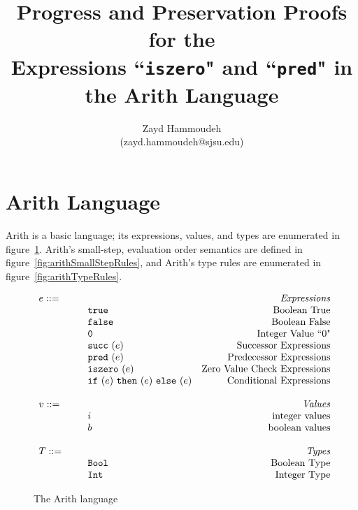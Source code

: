 \documentclass{report}
\title{Progress and Preservation Proofs for the \\
Expressions ``\texttt{iszero}" and ``\texttt{pred}" in the Arith Language}
\author{
  Zayd Hammoudeh \\
  (zayd.hammoudeh@sjsu.edu)
  }
\begin{document}
\maketitle


\tableofcontents{\protect\newpage}

\listoffigures
\newpage
 

\renewcommand\thesection{\arabic{section}}

\section{Arith Language}\label{sec:jvm}

Arith is a basic language; its expressions, values, and types are enumerated in figure~\ref{fig:arithLanguage}.  Arith's small-step, evaluation order semantics are defined in figure~\ref{fig:arithSmallStepRules}, and Arith's type rules are enumerated in figure~\ref{fig:arithTypeRules}.

\newcommand{\mydefhead}[2]{\multicolumn{2}{l}{{#1}}&\mbox{\emph{#2}}\\}
\newcommand{\mydefcase}[2]{\qquad\qquad& #1 &\mbox{#2}\\}

\newcommand{\assign}[2]{#1~{:=}~#2}
\newcommand{\ife}[3]{\mbox{\tt if}~({#1})~\mbox{\tt then}~({#2})~\mbox{\tt else}~({#3})}
\newcommand{\iszeroe}[1]{\mbox{\tt iszero}~(#1)}
\newcommand{\prede}[1]{\mbox{\tt pred}~(#1)}
\newcommand{\succe}[1]{\mbox{\tt succ}~(#1)}
\newcommand{\true}{\mbox{\tt true}}
\newcommand{\false}{\mbox{\tt false}}
\newcommand{\zero}{\mbox{\tt 0}}
\newcommand{\boolt}{\mbox{\tt Bool}}
\newcommand{\intt}{\mbox{\tt Int}}

\begin{figure}[ht!]
\[
\begin{array}{llr}
  \mydefhead{e ::=\qquad\qquad\qquad\qquad}{Expressions}
  \mydefcase{\true}{Boolean True}
  \mydefcase{\false}{Boolean False}
  \mydefcase{\zero}{Integer Value ``0"}
  \mydefcase{\succe e}{Successor Expressions}
  \mydefcase{\prede e}{Predecessor Expressions}
  \mydefcase{\iszeroe e}{Zero Value Check Expressions}
  \mydefcase{\ife e e e}{Conditional Expressions}
  \\
  \mydefhead{v ::=\qquad\qquad\qquad\qquad}{Values}
  \mydefcase{i}{integer values}
  \mydefcase{b}{boolean values}
  \\
  \mydefhead{T ::=\qquad\qquad\qquad\qquad}{Types}
  \mydefcase{\boolt}{Boolean Type}
  \mydefcase{\intt}{Integer Type}
\end{array}
\]
\caption{The Arith language}\label{fig:arithLanguage}
\end{figure}
\end{document}
